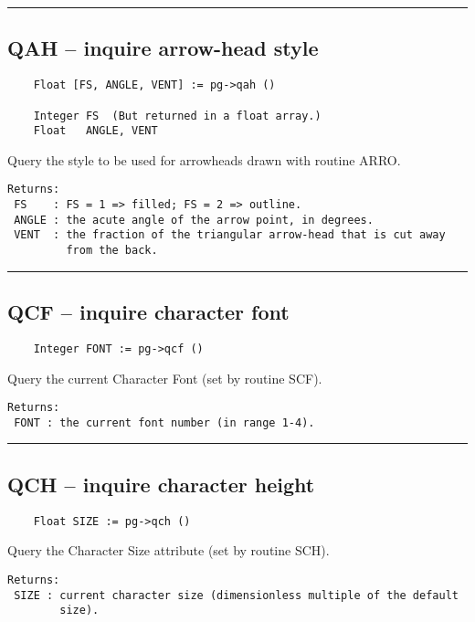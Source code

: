 \hrule

\subsection*{QAH -- inquire arrow-head style }

\begin{verbatim}
    Float [FS, ANGLE, VENT] := pg->qah ()

    Integer FS  (But returned in a float array.)
    Float   ANGLE, VENT
\end{verbatim}

Query the style to be used for arrowheads drawn with routine ARRO.

\begin{verbatim}
Returns:
 FS    : FS = 1 => filled; FS = 2 => outline.
 ANGLE : the acute angle of the arrow point, in degrees.
 VENT  : the fraction of the triangular arrow-head that is cut away
         from the back. 
\end{verbatim}

\hrule

\subsection*{QCF -- inquire character font }

\begin{verbatim}
    Integer FONT := pg->qcf ()
\end{verbatim}

Query the current Character Font (set by routine SCF).

\begin{verbatim}
Returns:
 FONT : the current font number (in range 1-4).
\end{verbatim}

\hrule

\subsection*{QCH -- inquire character height }

\begin{verbatim}
    Float SIZE := pg->qch ()
\end{verbatim}

Query the Character Size attribute (set by routine SCH).

\begin{verbatim}
Returns:
 SIZE : current character size (dimensionless multiple of the default
        size). 
\end{verbatim}

